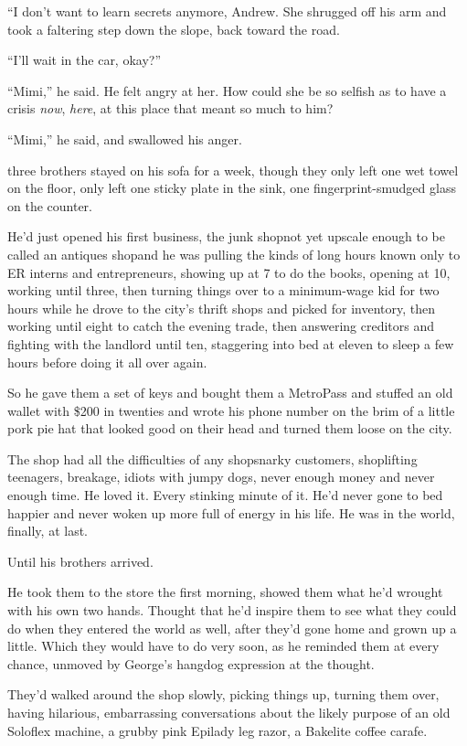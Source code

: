 ``I don't want to learn secrets anymore, Andrew.  She shrugged off his
arm and took a faltering step down the slope, back toward the road.

``I'll wait in the car, okay?''

``Mimi,'' he said.  He felt angry at her.  How could she be so selfish
as to have a crisis \textit{now}, \textit{here}, at this place that
meant so much to him?

``Mimi,'' he said, and swallowed his anger.

 three brothers stayed on his sofa for a week, though they only
left one wet towel on the floor, only left one sticky plate in the
sink, one fingerprint-smudged glass on the counter.

He'd just opened his first business, the junk shop\dash{}not yet upscale
enough to be called an antiques shop\dash{}and he was pulling the kinds of
long hours known only to ER interns and entrepreneurs, showing up at 7
to do the books, opening at 10, working until three, then turning
things over to a minimum-wage kid for two hours while he drove to the
city's thrift shops and picked for inventory, then working until eight
to catch the evening trade, then answering creditors and fighting with
the landlord until ten, staggering into bed at eleven to sleep a few
hours before doing it all over again.

So he gave them a set of keys and bought them a MetroPass and stuffed
an old wallet with \$200 in twenties and wrote his phone number on the
brim of a little pork pie hat that looked good on their head and
turned them loose on the city.

The shop had all the difficulties of any shop\dash{}snarky customers,
shoplifting teenagers, breakage, idiots with jumpy dogs, never enough
money and never enough time.  He loved it.  Every stinking minute of
it.  He'd never gone to bed happier and never woken up more full of
energy in his life.  He was in the world, finally, at last.

Until his brothers arrived.

He took them to the store the first morning, showed them what he'd
wrought with his own two hands.  Thought that he'd inspire them to see
what they could do when they entered the world as well, after they'd
gone home and grown up a little.  Which they would have to do very
soon, as he reminded them at every chance, unmoved by George's hangdog
expression at the thought.

They'd walked around the shop slowly, picking things up, turning them
over, having hilarious, embarrassing conversations about the likely
purpose of an old Soloflex machine, a grubby pink Epilady leg razor, a
Bakelite coffee carafe.


